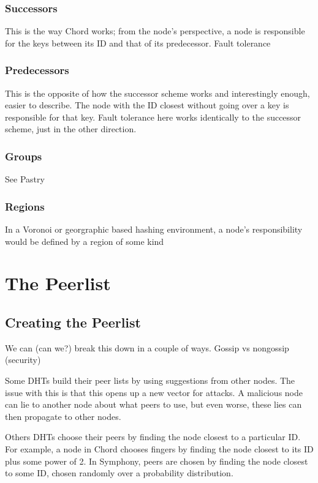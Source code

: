 \documentclass[10pt,letterpaper]{report}
\begin{document}
\subsubsection{Successors}
This is the way Chord works;  from the node's perspective, a node is responsible for the keys between its ID and that of its predecessor.   Fault tolerance

\subsubsection{Predecessors}
This is the opposite of how the successor scheme works and interestingly enough, easier to describe.  The node with the ID closest without going over a key is responsible for that key.  Fault tolerance here works identically to the successor scheme, just in the other direction.


\subsubsection{Groups}

See Pastry

\subsubsection{Regions}
In a Voronoi or georgraphic based hashing environment, a node's responsibility would be defined by a region of some kind





\section{The Peerlist}


\subsection{Creating the Peerlist}
We can (can we?) break this down in a couple of ways.  Gossip vs nongossip (security)


Some DHTs build their peer lists by using suggestions from other nodes.  The issue with this is that this opens up a new vector for attacks.   A malicious node can lie to another node about what peers to use, but even worse, these lies can then propagate to other nodes.

Others DHTs choose their peers by finding the node closest to a particular ID.  For example, a node in Chord chooses fingers by finding the node closest to its ID plus some  power of 2.    In Symphony, peers are chosen by finding the node closest to some ID, chosen randomly over a probability distribution.
\end{document}
